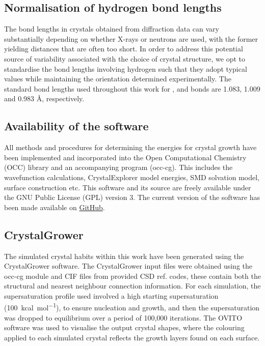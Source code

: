 \documentclass[twoside,twocolumn,9pt]{article}
\begin{document}
\subsection{Normalisation of hydrogen bond lengths}

The  bond lengths in crystals obtained from diffraction data can vary substantially depending on whether
X-rays or neutrons are used, with the former yielding distances that are often too short. In order to 
address this potential source of variability associated with the choice of crystal structure, we opt 
to standardise the bond lengths involving hydrogen such that they adopt typical values while maintaining the orientation determined experimentally. The standard bond lengths used throughout this work for ,  and  bonds are 1.083, 1.009 and 0.983 Å, respectively.

\subsection{Availability of the software}
All methods and procedures for determining the energies for crystal growth have been implemented and 
incorporated into the Open Computational Chemistry (OCC) library and an accompanying program (occ-cg).
This includes the wavefunction calculations, CrystalExplorer model energies, SMD solvation model, 
surface construction etc. This software and its source are freely available under the GNU Public License (GPL) version 3. The current version of the software has been made available on \href{https://github.com/peterspackman/occ}{GitHub}.

\subsection{CrystalGrower}

The simulated crystal habits within this work have been generated using the CrystalGrower software. 
The CrystalGrower input files were obtained using the occ-cg module and CIF files from provided CSD ref. codes, 
these contain both the structural and nearest neighbour connection information.\cite{Hill2021} 
For each simulation, the supersaturation profile used involved a high starting supersaturation (\qty{100}{kcal.mol^{-1}}), to ensure nucleation and growth, and then the supersaturation was dropped to equilibrium over a period of 100,000 iterations.  The OVITO software was used to visualise the output crystal shapes,\cite{Ovito2010} where the colouring applied to each simulated crystal reflects the growth layers found on each surface.
\end{document}
